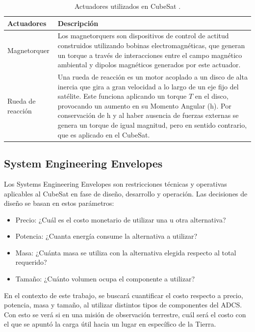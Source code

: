 \begin{table}[h!]
	\centering
	\caption{Actuadores utilizados en CubeSat \cite{ref6}.}
	\begin{tabular}{|l|p{10cm}|}
		\hline
		\textbf{Actuadores} & \textbf{Descripción} \\ \hline
		Magnetorquer & Los magnetorquers son dispositivos de control de actitud construidos utilizando bobinas electromagnéticas, que generan un torque a través de interacciones entre el campo magnético ambiental y dipolos magnéticos generados por este actuador. \\ \hline
		Rueda de reacción & Una rueda de reacción es un motor acoplado a un disco de alta inercia que gira a gran velocidad a lo largo de un eje fijo del satélite. Este funciona aplicando un torque \( T \) en el disco, provocando un aumento en su Momento Angular (\gls{h}). Por conservación de \gls{h} y al haber ausencia de fuerzas externas se genera un torque de igual magnitud, pero en sentido contrario, que es aplicado en el CubeSat. \\ \hline
	\end{tabular}
	\label{tab:actuadores}
\end{table}

\subsection{System Engineering Envelopes}

Los Systems Engineering Envelopes son restricciones técnicas y operativas aplicables al CubeSat en fase de diseño, desarrollo y operación. Las decisiones de diseño se basan en estos parámetros:

\begin{itemize}
	\item Precio: ¿Cuál es el costo monetario de utilizar una u otra alternativa?
	\item Potencia: ¿Cuanta energía consume la alternativa a utilizar?
	\item Masa: ¿Cuánta masa se utiliza con la alternativa elegida respecto al total requerido?
	\item Tamaño: ¿Cuánto volumen ocupa el componente a utilizar?
\end{itemize}

En el contexto de este trabajo, se buscará cuantificar el costo respecto a precio, potencia, masa y tamaño, al utilizar distintos tipos de componentes del \gls{ADCS}. Con esto se verá si en una misión de observación terrestre, cuál será el costo con el que se apuntó la carga útil hacia un lugar en específico de la Tierra.

